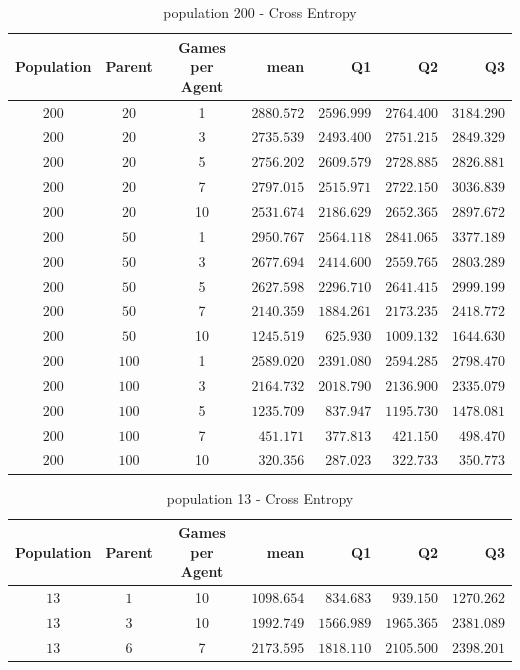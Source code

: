 \begin{table}[H]
\centering
\small
\begin{tabular}{c c c r r r r}
Population & Parent & Games per Agent & mean & Q1 & Q2 & Q3\\
\hline
\hdashline
$200$ & $20$ & 1 & $2880.572$ & $2596.999$ & $2764.400$ & $3184.290$\\
\hdashline
$200$ & $20$ & 3 & $2735.539$ & $2493.400$ & $2751.215$ & $2849.329$\\
$200$ & $20$ & 5 & $2756.202$ & $2609.579$ & $2728.885$ & $2826.881$\\
$200$ & $20$ & 7 & $2797.015$ & $2515.971$ & $2722.150$ & $3036.839$\\
$200$ & $20$ & 10 & $2531.674$ & $2186.629$ & $2652.365$ & $2897.672$\\
\hdashline
$200$ & $50$ & 1 & $2950.767$ & $2564.118$ & $2841.065$ & $3377.189$\\
\hdashline
$200$ & $50$ & 3 & $2677.694$ & $2414.600$ & $2559.765$ & $2803.289$\\
$200$ & $50$ & 5 & $2627.598$ & $2296.710$ & $2641.415$ & $2999.199$\\
$200$ & $50$ & 7 & $2140.359$ & $1884.261$ & $2173.235$ & $2418.772$\\
$200$ & $50$ & 10 & $1245.519$ & $625.930$ & $1009.132$ & $1644.630$\\
\hdashline
$200$ & $100$ & 1 & $2589.020$ & $2391.080$ & $2594.285$ & $2798.470$\\
\hdashline
$200$ & $100$ & 3 & $2164.732$ & $2018.790$ & $2136.900$ & $2335.079$\\
$200$ & $100$ & 5 & $1235.709$ & $837.947$ & $1195.730$ & $1478.081$\\
$200$ & $100$ & 7 & $451.171$ & $377.813$ & $421.150$ & $498.470$\\
$200$ & $100$ & 10 & $320.356$ & $287.023$ & $322.733$ & $350.773$\\
\end{tabular}
\caption{population 200 - Cross Entropy}
\end{table}

\clearpage

\begin{table}[H]
\centering
\small
\begin{tabular}{c c c r r r r}
Population & Parent & Games per Agent & mean & Q1 & Q2 & Q3\\
\hline
$13$ & $1$ & 10 & $1098.654$ & $834.683$ & $939.150$ & $1270.262$\\
$13$ & $3$ & 10 & $1992.749$ & $1566.989$ & $1965.365$ & $2381.089$\\
$13$ & $6$ & 7 & $2173.595$ & $1818.110$ & $2105.500$ & $2398.201$\\
\end{tabular}
\caption{population 13 - Cross Entropy}
\end{table}

